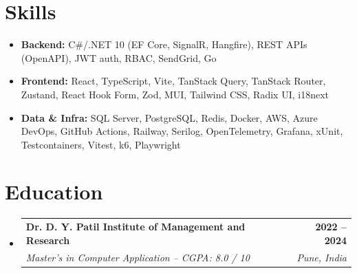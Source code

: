 \documentclass[letterpaper,10pt]{article}
\makeatletter
\newcommand{\resumeSubheading}[4]{
  \vspace{-2pt}\item
    \begin{tabular*}{1.0\textwidth}[t]{l@{\extracolsep{\fill}}r}
      \textbf{#1} & \textbf{\small #2} \\
      \textit{\small#3} & \textit{\small #4} \\
    \end{tabular*}\vspace{-5pt}
}
\newcommand{\resumeSubHeadingListStart}{\begin{itemize}[leftmargin=0.0in, label={}, topsep=2pt, itemsep=1pt]}
\newcommand{\resumeSubHeadingListEnd}{\end{itemize}}
\makeatother
\begin{document}
\section{Skills}
\begin{itemize}[leftmargin=0in, label={}, itemsep=1pt, parsep=0pt, topsep=3pt]
  \small
  \item \textbf{Backend:} C\#/.NET 10 (EF Core, SignalR, Hangfire), REST APIs (OpenAPI), JWT auth, RBAC, SendGrid, Go
  \item \textbf{Frontend:} React, TypeScript, Vite, TanStack Query, TanStack Router, Zustand, React Hook Form, Zod, MUI, Tailwind CSS, Radix UI, i18next
  \item \textbf{Data \& Infra:} SQL Server, PostgreSQL, Redis, Docker, AWS, Azure DevOps, GitHub Actions, Railway, Serilog, OpenTelemetry, Grafana, xUnit, Testcontainers, Vitest, k6, Playwright
\end{itemize}

\section{Education}
\resumeSubHeadingListStart
  \resumeSubheading
    {Dr. D. Y. Patil Institute of Management and Research}{2022 -- 2024}
    {Master's in Computer Application -- CGPA: 8.0 / 10}{Pune, India}
\resumeSubHeadingListEnd
\end{document}
